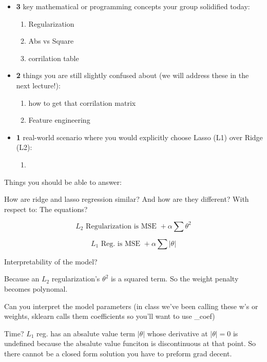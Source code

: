 \documentclass[11pt]{article}
\providecommand{\tightlist}{%
      \setlength{\itemsep}{0pt}\setlength{\parskip}{0pt}}
\begin{document}
\begin{itemize}
\item
  \textbf{3} key mathematical or programming concepts your group
  solidified today:

  \begin{enumerate}
  \def\labelenumi{\arabic{enumi}.}
  \item
    Regularization
  \item
    Abs vs Square
  \item
    corrilation table
  \end{enumerate}
\item
  \textbf{2} things you are still slightly confused about (we will
  address these in the next lecture!):

  \begin{enumerate}
  \def\labelenumi{\arabic{enumi}.}
  \item
    how to get that corrilation matrix
  \item
    Feature engineering
  \end{enumerate}
\item
  \textbf{1} real-world scenario where you would explicitly choose Lasso
  (L1) over Ridge (L2):

  \begin{enumerate}
  \def\labelenumi{\arabic{enumi}.}
  \tightlist
  \item
  \end{enumerate}
\end{itemize}

    Things you should be able to answer:

How are ridge and lasso regression similar? And how are they different?
With respect to: The equations?

\[L_2 \text{ Regularization is MSE } + \alpha \sum \theta^{2}\]

\[L_1 \text{ Reg. is MSE } + \alpha \sum | \theta |\]

Interpretability of the model?

Because an \(L_2\) regularization's \(\theta^{2}\) is a squared term. So
the weight penalty becomes polynomal.

Can you interpret the model parameters (in class we've been calling
these w's or weights, sklearn calls them coefficients so you'll want to
use \_coef)

Time? \(L_1\) reg. has an absalute value term \(|\theta|\) whose
derivative at \(|\theta| = 0\) is undefined because the absalute value
funciton is discontinuous at that point. So there cannot be a closed
form solution you have to preform grad decent.
\end{document}
